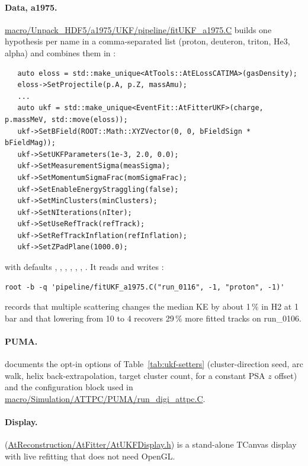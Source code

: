 \paragraph{Data, a1975.} \url{macro/Unpack_HDF5/a1975/UKF/pipeline/fitUKF_a1975.C} builds one hypothesis per name in a
comma-separated list (proton, deuteron, triton, He3, alpha) and combines them in :
\begingroup\footnotesize
\begin{verbatim}
   auto eloss = std::make_unique<AtTools::AtELossCATIMA>(gasDensity);
   eloss->SetProjectile(p.A, p.Z, massAmu);
   ...
   auto ukf = std::make_unique<EventFit::AtFitterUKF>(charge, p.massMeV, std::move(eloss));
   ukf->SetBField(ROOT::Math::XYZVector(0, 0, bFieldSign * bFieldMag));
   ukf->SetUKFParameters(1e-3, 2.0, 0.0);
   ukf->SetMeasurementSigma(measSigma);
   ukf->SetMomentumSigmaFrac(momSigmaFrac);
   ukf->SetEnableEnergyStraggling(false);
   ukf->SetMinClusters(minClusters);
   ukf->SetNIterations(nIter);
   ukf->SetUseRefTrack(refTrack);
   ukf->SetRefTrackInflation(refInflation);
   ukf->SetZPadPlane(1000.0);
\end{verbatim}
\endgroup
with defaults , , , ,
, , . It reads  and writes
:
\begin{verbatim}
root -b -q 'pipeline/fitUKF_a1975.C("run_0116", -1, "proton", -1)'
\end{verbatim}
 records that multiple scattering changes the median KE by about 1\,\% in H2 at 1\,bar and
that lowering  from 10 to 4 recovers 29\,\% more fitted tracks on run\_0106.

\paragraph{PUMA.}  documents the opt-in options of
Table~\ref{tab:ukf-setters} (cluster-direction seed, arc walk, helix back-extrapolation, target cluster count,
 for a constant PSA $z$ offset) and the configuration block used in
\url{macro/Simulation/ATTPC/PUMA/run_digi_attpc.C}.

\paragraph{Display.}  (\url{AtReconstruction/AtFitter/AtUKFDisplay.h}) is a stand-alone TCanvas
display with live refitting that does not need OpenGL.

